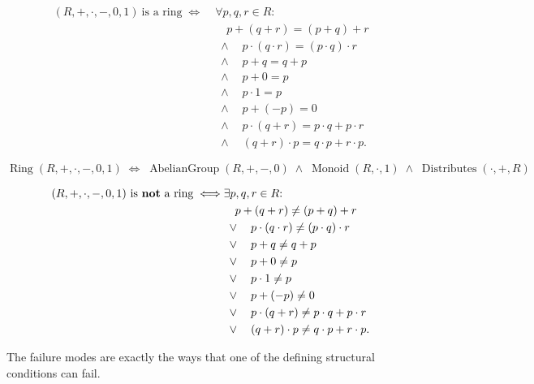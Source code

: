 \begin{remark*}
\[
\begin{aligned}
(R,+,\cdot,-,0,1)\ \text{is a ring}
\;\Longleftrightarrow\;
  &\forall p,q,r \in R{:} \\
  &\quad p + (q + r) = (p + q) + r \\
  &\;\land\quad p \cdot (q \cdot r) = (p \cdot q) \cdot r \\
  &\;\land\quad p + q = q + p \\
  &\;\land\quad p + 0 = p \\
  &\;\land\quad p \cdot 1 = p \\
  &\;\land\quad p + (-p) = 0 \\
  &\;\land\quad p \cdot (q + r) = p \cdot q + p \cdot r \\
  &\;\land\quad (q + r) \cdot p = q \cdot p + r \cdot p.
\end{aligned}
\]
\end{remark*}

\begin{remark*}
\[
\operatorname{Ring}(R,+,\cdot,-,0,1)
\;\Longleftrightarrow\;
\operatorname{AbelianGroup}(R,+,-,0)
\;\land\;
\operatorname{Monoid}(R,\cdot,1)
\;\land\;
\operatorname{Distributes}(\cdot,+,R)
\]
\end{remark*}

\begin{remark*}
\[
\begin{aligned}
(R,+,\cdot,-,0,1)\ \text{is \textbf{not} a ring}
\;\Longleftrightarrow\;
  &\exists p,q,r \in R{:} \\
  &\quad p + (q + r) \neq (p + q) + r \\
  &\;\lor\quad p \cdot (q \cdot r) \neq (p \cdot q) \cdot r \\
  &\;\lor\quad p + q \neq q + p \\
  &\;\lor\quad p + 0 \neq p \\
  &\;\lor\quad p \cdot 1 \neq p \\
  &\;\lor\quad p + (-p) \neq 0 \\
  &\;\lor\quad p \cdot (q + r) \neq p \cdot q + p \cdot r \\
  &\;\lor\quad (q + r) \cdot p \neq q \cdot p + r \cdot p.
\end{aligned}
\]
\end{remark*}

\begin{remark*}
The failure modes are exactly the ways that one of the defining structural
conditions can fail.
\end{remark*}

